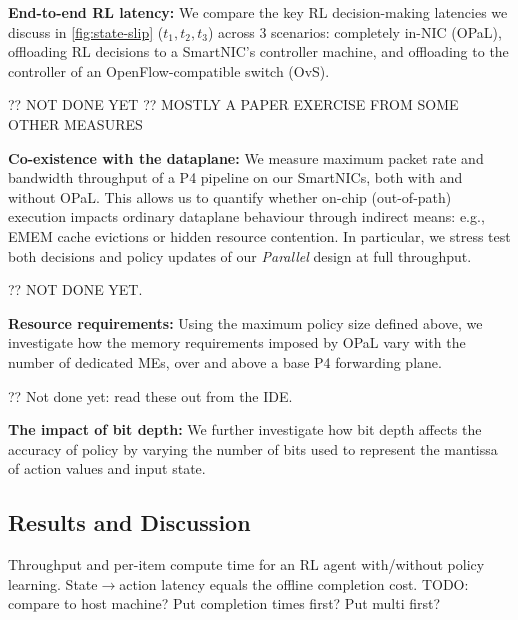 \documentclass[sigconf,natbib=false]{acmart}
\newcommand{\fakepara}[1]{\noindent\textbf{#1:}}
\newcommand{\approachshort}{OPaL}
\begin{document}
\fakepara{End-to-end RL latency}
We compare the key RL decision-making latencies we discuss in \cref{fig:state-slip} ($t_1,t_2,t_3$) across 3 scenarios: completely in-NIC (\approachshort{}), offloading RL decisions to a SmartNIC's controller machine, and offloading to the controller of an OpenFlow-compatible switch (OvS).

?? NOT DONE YET
?? MOSTLY A PAPER EXERCISE FROM SOME OTHER MEASURES

\fakepara{Co-existence with the dataplane}
We measure maximum packet rate and bandwidth throughput of a P4 pipeline on our SmartNICs, both with and without \approachshort{}.
This allows us to quantify whether on-chip (out-of-path) execution impacts ordinary dataplane behaviour through indirect means: e.g., EMEM cache evictions or hidden resource contention.
In particular, we stress test both decisions and policy updates of our \emph{Parallel} design at full throughput.

?? NOT DONE YET.

\fakepara{Resource requirements}
Using the maximum policy size defined above, we investigate how the memory requirements imposed by \approachshort{} vary with the number of dedicated MEs, over and above a base P4 forwarding plane.

?? Not done yet: read these out from the IDE.

\fakepara{The impact of bit depth}
We further investigate how bit depth affects the accuracy of policy by varying the number of bits used to represent the mantissa of action values and input state.

\subsection{Results and Discussion}\label{sec:results}

\begin{table}
	\caption{Throughput and per-item compute time for an RL agent with/without policy learning. State$\rightarrow$action latency equals the offline completion cost. TODO: compare to host machine? Put completion times first? Put multi first?}
\end{table}
\end{document}
